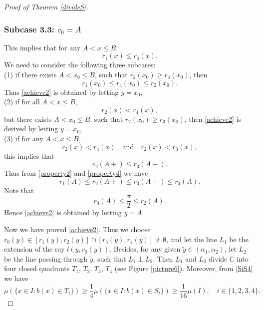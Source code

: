 \documentclass[oneside,english,a4wide]{amsart}
\numberwithin{equation}{section}
\numberwithin{figure}{section}
\theoremstyle{plain}
\theoremstyle{plain}
\theoremstyle{definition}
\theoremstyle{plain}
\theoremstyle{remark}
\theoremstyle{definition}
\theoremstyle{remark}
\theoremstyle{definition}
\newcommand{\8}{\infty}
\begin{document}
\begin{proof}[Proof of Theorem \ref{divideS}]
	\smallskip
	
	\subsubsection*{Subcase 3.3:  $c_0=A$} 
	This implies that for any $A<x\le B$,
	\begin{equation*}
		r_1(x)\le r_4(x).
	\end{equation*}
	We need to consider the following three subcases:\\
	(1) if there exists $A<x_0\le B$, such that $r_2(x_0)\ge r_4(x_0)$, then
		\begin{equation*}
			r_1(x_0)\le r_4(x_0)\le r_2(x_0).
		\end{equation*}
		Thus \eqref{achieve2} is obtained by letting $y=x_0$,\\
	(2) if for all $A<x\le B$, 
		\begin{equation*}
			r_2(x)<r_4(x),
		\end{equation*}
		but there exists $A<x_0\le B$, such that $r_2(x_0)\ge r_3(x_0)$, then \eqref{achieve2} is derived by letting $y=x_0$,\\
	(3) if for any $A<x\le B$, 
		\begin{equation*}
			r_2(x)<r_4(x)\quad \text{and} \quad r_2(x)<r_3(x),
		\end{equation*}
		this implies that 
		\begin{equation*}
			r_2(A+)\le r_3(A+).
		\end{equation*}
		Thus from \eqref{property2} and \eqref{property4} we have
		\begin{equation*}
			r_1(A)\leq r_2(A+)\le r_3(A+)\leq r_4(A).
		\end{equation*}
		Note that 
		\begin{equation*}
			r_3(A)\le \frac{\pi}{2}\le r_2(A).
		\end{equation*}
		Hence \eqref{achieve2} is obtained by letting $y=A$.

	Now we have proved \eqref{achieve2}. Thus we choose $r_0(y)\in [r_1(y),r_2(y)]\cap [r_3(y),r_4(y)]\neq \emptyset$, and let the line $L_1$ be the extension of the ray $l({y,r_0(y)})$. Besides, for any given $\tilde{y}\in (\alpha_1,\alpha_2)$, let $L_2$ be the line passing through $\tilde{y}$, such that $L_1\perp L_2$. Then $L_1$ and $L_2$ divide $\mathbb{C}$ into four closed quadrants $T_1$, $T_2$, $T_3$, $T_4$ (see Figure \ref{picture6}). Moreover, from \eqref{SiS4} we have
	\begin{equation*}
		\mu(\{x\in I:b(x)\in T_i\})\ge \frac{1}{4}\mu(\{x\in I:b(x)\in S_i\})\ge \frac{1}{16}\mu(I),\quad i\in \{1,2,3,4\}.
	\end{equation*}
\end{proof}
\end{document}
